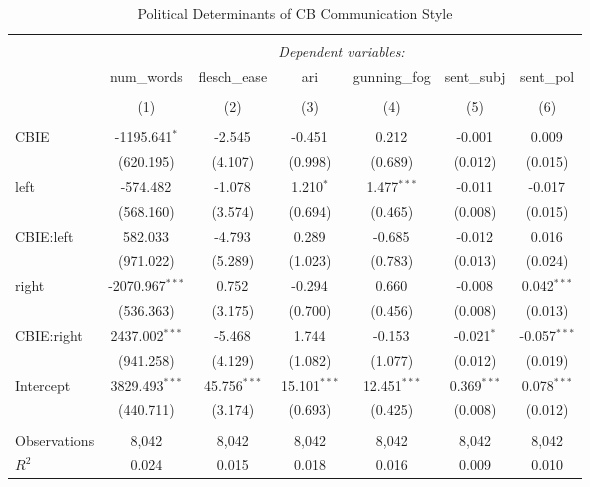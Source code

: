 \begin{table}[!htbp] \centering
  \caption{Political Determinants of CB Communication Style}
\begin{tabular}{@{\extracolsep{5pt}}lcccccc}
\\[-1.8ex]\hline
\hline \\[-1.8ex]
& \multicolumn{6}{c}{\textit{Dependent variables:}} \
\cr \cline{6-7}
\\[-1.8ex] & \multicolumn{1}{c}{num_words} & \multicolumn{1}{c}{flesch_ease} & \multicolumn{1}{c}{ari} & \multicolumn{1}{c}{gunning_fog} & \multicolumn{1}{c}{sent_subj} & \multicolumn{1}{c}{sent_pol}  \\
\\[-1.8ex] & (1) & (2) & (3) & (4) & (5) & (6) \\
\hline \\[-1.8ex]
 CBIE & -1195.641$^{*}$ & -2.545$^{}$ & -0.451$^{}$ & 0.212$^{}$ & -0.001$^{}$ & 0.009$^{}$ \\
  & (620.195) & (4.107) & (0.998) & (0.689) & (0.012) & (0.015) \\
 left & -574.482$^{}$ & -1.078$^{}$ & 1.210$^{*}$ & 1.477$^{***}$ & -0.011$^{}$ & -0.017$^{}$ \\
  & (568.160) & (3.574) & (0.694) & (0.465) & (0.008) & (0.015) \\
 CBIE:left & 582.033$^{}$ & -4.793$^{}$ & 0.289$^{}$ & -0.685$^{}$ & -0.012$^{}$ & 0.016$^{}$ \\
  & (971.022) & (5.289) & (1.023) & (0.783) & (0.013) & (0.024) \\
 right & -2070.967$^{***}$ & 0.752$^{}$ & -0.294$^{}$ & 0.660$^{}$ & -0.008$^{}$ & 0.042$^{***}$ \\
  & (536.363) & (3.175) & (0.700) & (0.456) & (0.008) & (0.013) \\
 CBIE:right & 2437.002$^{***}$ & -5.468$^{}$ & 1.744$^{}$ & -0.153$^{}$ & -0.021$^{*}$ & -0.057$^{***}$ \\
  & (941.258) & (4.129) & (1.082) & (1.077) & (0.012) & (0.019) \\
 Intercept & 3829.493$^{***}$ & 45.756$^{***}$ & 15.101$^{***}$ & 12.451$^{***}$ & 0.369$^{***}$ & 0.078$^{***}$ \\
  & (440.711) & (3.174) & (0.693) & (0.425) & (0.008) & (0.012) \\
\hline \\[-1.8ex]
 Observations & 8,042 & 8,042 & 8,042 & 8,042 & 8,042 & 8,042 \\
 $R^2$ & 0.024 & 0.015 & 0.018 & 0.016 & 0.009 & 0.010 \\

\end{tabular}
\end{table}
